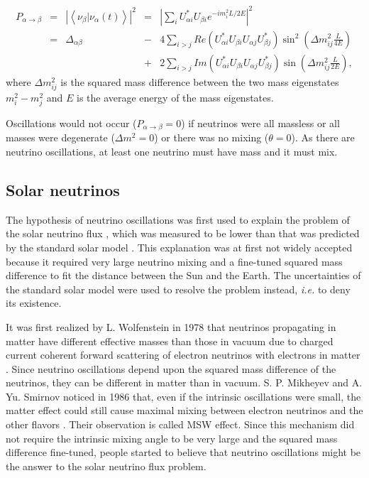\begin{equation}
  \label{eq:pa2b}
  \begin{array}{ccccl}
    P_{\alpha \rightarrow \beta} &=& \left| \left\langle                 \nu_{\beta}|\nu_{\alpha}(t) \right\rangle \right|^{2} &=&     {\displaystyle \left|       \sum_{i}U_{\alpha i}^{*}U_{\beta i}e^{-i           m_{i}^2 L/2E} \right|^{2}}\\ &=& \Delta_{\alpha\beta} &-&     4{\displaystyle \sum_{i>j}Re(U_{\alpha         i}^{*}U_{\beta         i}U_{\alpha j}U_{\beta j}^{*})\sin^{2}(\Delta     m_{ij}^{2}       \frac{L}{4E})}\\ & & &+& {\displaystyle 2\sum_{i>j}Im(U_{\alpha         i}^{*}U_{\beta i}U_{\alpha j}U_{\beta j}^{*})\sin(\Delta       m_{ij}^{2}\frac{L}{2E})},
  \end{array}
\end{equation}
where $\Delta m^{2}_{ij}$ is the squared mass difference between the
two mass eigenstates $m^{2}_{i} - m^{2}_{j}$ and $E$ is the
average energy of the mass eigenstates.

Oscillations would not occur ($P_{\alpha \rightarrow \beta} = 0$) if neutrinos were all massless or all masses were degenerate ($\Delta m^{2} = 0$) or there was no mixing ($\theta = 0$). As there are neutrino oscillations, at least one neutrino must have mass and it must mix.

\subsection{Solar neutrinos}
\label{sec:solar}
The hypothesis of neutrino oscillations was first used to explain the problem of the solar neutrino flux \cite{Dav64, Dav68}, which was measured to be lower than that was predicted by the standard solar model \cite{Bah98}. This explanation was at first not widely accepted because it required very large neutrino mixing and a fine-tuned squared mass difference to fit the distance between the Sun and the Earth. The uncertainties of the standard solar model were used to resolve the problem instead, \textit{i.e.} to deny its existence.

It was first realized by L. Wolfenstein in 1978 that neutrinos propagating in matter have different effective masses than those in vacuum due to charged current coherent forward scattering of electron neutrinos with electrons in matter \cite{Wol78}. Since neutrino oscillations depend upon the squared mass difference of the neutrinos, they can be different in matter than in vacuum. S. P. Mikheyev and A. Yu. Smirnov noticed in 1986 that, even if the intrinsic oscillations were small, the matter effect could still cause maximal mixing between electron neutrinos and the other flavors \cite{Mik86}. Their observation is called MSW effect. Since this mechanism did not require the intrinsic mixing angle to be very large and the squared mass difference fine-tuned, people started to believe that neutrino oscillations might be the answer to the solar neutrino flux problem.

